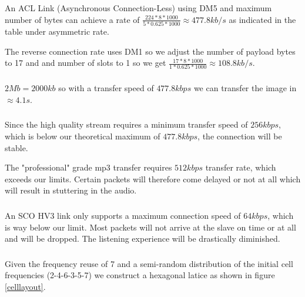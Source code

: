 \documentclass[12pt]{article}
\newcommand{\multipartexercise}{\addtocounter{subsection}{1}\setcounter{subsubsection}{0}}
\newcommand{\exercisepart}{\subsubsection{}}
\begin{document}
An ACL Link (Asynchronous Connection-Less) using DM5 and maximum number of bytes can achieve a rate of $\frac{224*8*1000}{5*0.625*1000} \approx 477.8kb/s$ as indicated in the table under asymmetric rate.

The reverse connection rate uses DM1 so we adjust the number of payload bytes to 17 and and number of slots to 1 so we get $\frac{17*8*1000}{1*0.625*1000} \approx 108.8kb/s$.

\exercisepart
$2Mb=2000kb$ so with a transfer speed of $477.8kbps$ we can transfer the image in $\approx4.1s$.

\exercisepart
Since the high quality stream requires a minimum transfer speed of $256kbps$, which is below our theoretical maximum of $477.8kbps$, the connection will be stable.

The "professional" grade mp3 transfer requires $512kbps$ transfer rate, which exceeds our limits. Certain packets will therefore come delayed or not at all which will result in stuttering in the audio.

\exercisepart
An SCO HV3 link only supports a maximum connection speed of $64kbps$, which is way below our limit. Most packets will not arrive at the slave on time or at all and will be dropped. The listening experience will be drastically diminished.

\multipartexercise
\exercisepart
Given the frequency reuse of 7 and a semi-random distribution of the initial cell frequencies (2-4-6-3-5-7) we construct a hexagonal latice as shown in figure \ref{celllayout}.
\end{document}
